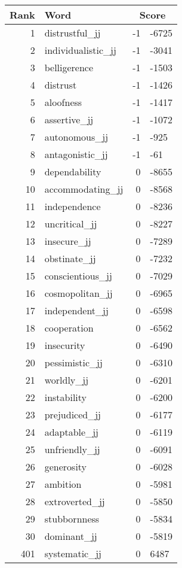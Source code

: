 \begin{longtable}[!htbp]{| rlr@{.}l |}
    \hline
    \textbf{Rank} & \textbf{Word} & \multicolumn{2}{c|}{\textbf{Score}} \\
    \hline
    \endhead
    1 & distrustful\_jj & -1 & -6725 \\
    2 & individualistic\_jj & -1 & -3041 \\
    3 & belligerence & -1 & -1503 \\
    4 & distrust & -1 & -1426 \\
    5 & aloofness & -1 & -1417 \\
    6 & assertive\_jj & -1 & -1072 \\
    7 & autonomous\_jj & -1 & -925 \\
    8 & antagonistic\_jj & -1 & -61 \\
    9 & dependability & 0 & -8655 \\
    10 & accommodating\_jj & 0 & -8568 \\
    11 & independence & 0 & -8236 \\
    12 & uncritical\_jj & 0 & -8227 \\
    13 & insecure\_jj & 0 & -7289 \\
    14 & obstinate\_jj & 0 & -7232 \\
    15 & conscientious\_jj & 0 & -7029 \\
    16 & cosmopolitan\_jj & 0 & -6965 \\
    17 & independent\_jj & 0 & -6598 \\
    18 & cooperation & 0 & -6562 \\
    19 & insecurity & 0 & -6490 \\
    20 & pessimistic\_jj & 0 & -6310 \\
    21 & worldly\_jj & 0 & -6201 \\
    22 & instability & 0 & -6200 \\
    23 & prejudiced\_jj & 0 & -6177 \\
    24 & adaptable\_jj & 0 & -6119 \\
    25 & unfriendly\_jj & 0 & -6091 \\
    26 & generosity & 0 & -6028 \\
    27 & ambition & 0 & -5981 \\
    28 & extroverted\_jj & 0 & -5850 \\
    29 & stubbornness & 0 & -5834 \\
    30 & dominant\_jj & 0 & -5819 \\
    401 & systematic\_jj & 0 & 6487 \\

\end{longtable}
